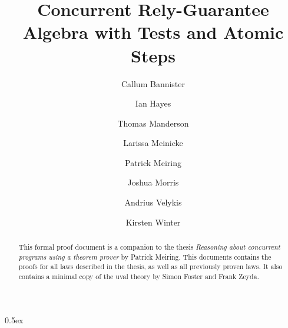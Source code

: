 \documentclass[11pt,a4paper]{article}
\begin{document}
\title{Concurrent Rely-Guarantee Algebra with Tests and Atomic Steps}
\author{Callum Bannister \and Ian Hayes \and Thomas Manderson \and Larissa Meinicke \and
       Patrick Meiring \and Joshua Morris \and Andrius Velykis \and Kirsten Winter}
\maketitle

\begin{abstract}
This formal proof document is a companion to the thesis \emph{Reasoning about concurrent programs using a theorem prover} by Patrick Meiring. This documents contains the proofs for all laws described in the thesis, as well as all previously proven laws. It also contains a minimal copy of the uval theory by Simon Foster and Frank Zeyda.
\end{abstract}

\tableofcontents
\parindent 0pt\parskip 0.5ex





\end{document}

